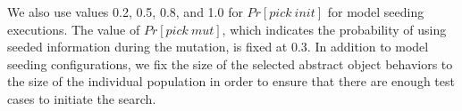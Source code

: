 

We also use values  0.2, 0.5, 0.8, and 1.0 for $Pr[pick\ init]$ for model seeding executions. The value of $Pr[pick\ mut]$, which indicates the probability of using seeded information during the mutation, is fixed at 0.3. In addition to model seeding configurations, we fix the size of the selected abstract object behaviors to the size of the individual population in order to ensure that there are enough test cases to initiate the search.







